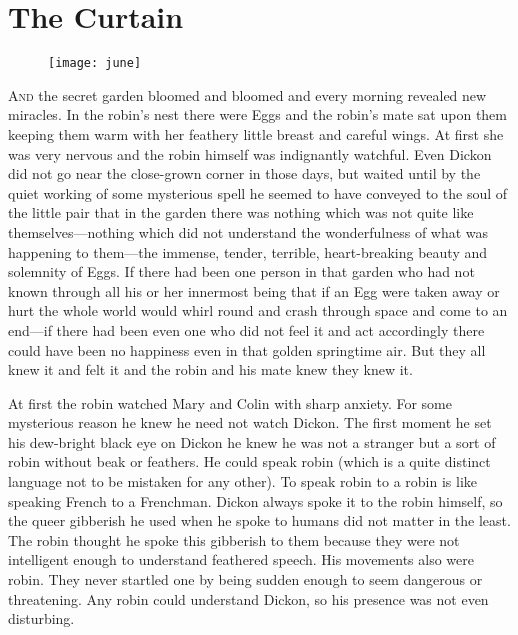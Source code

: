 \chapter{The Curtain} 
	
\begin{figure}[t!]
\centering
\texttt{[image: june]}
\end{figure}

 \lettrine[lines=6]{A}{nd} the secret garden bloomed and bloomed and every morning revealed new miracles. In the robin's nest there were Eggs and the robin's mate sat upon them keeping them warm with her feathery little breast and careful wings. At first she was very nervous and the robin himself was indignantly watchful. Even Dickon did not go near the close-grown corner in those days, but waited until by the quiet working of some mysterious spell he seemed to have conveyed to the soul of the little pair that in the garden there was nothing which was not quite like themselves—nothing which did not understand the wonderfulness of what was happening to them—the immense, tender, terrible, heart-breaking beauty and solemnity of Eggs. If there had been one person in that garden who had not known through all his or her innermost being that if an Egg were taken away or hurt the whole world would whirl round and crash through space and come to an end—if there had been even one who did not feel it and act accordingly there could have been no happiness even in that golden springtime air. But they all knew it and felt it and the robin and his mate knew they knew it.

At first the robin watched Mary and Colin with sharp anxiety. For some mysterious reason he knew he need not watch Dickon. The first moment he set his dew-bright black eye on Dickon he knew he was not a stranger but a sort of robin without beak or feathers. He could speak robin (which is a quite distinct language not to be mistaken for any other). To speak robin to a robin is like speaking French to a Frenchman. Dickon always spoke it to the robin himself, so the queer gibberish he used when he spoke to humans did not matter in the least. The robin thought he spoke this gibberish to them because they were not intelligent enough to understand feathered speech. His movements also were robin. They never startled one by being sudden enough to seem dangerous or threatening. Any robin could understand Dickon, so his presence was not even disturbing.

